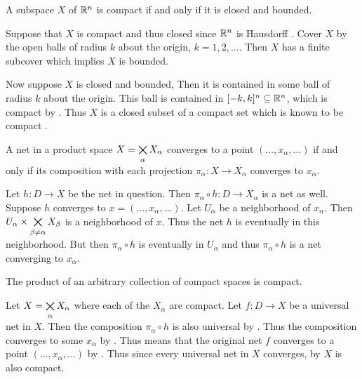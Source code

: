 \documentclass[letterpaper, 11pt, oneside]{book}
\begin{document}
\begin{cor}
  A subspace $X$ of $\mathbb{R}^{n}$ is compact if and only if it is closed and bounded.
\end{cor}
\begin{pf}
  Suppose that $X$ is compact and thus closed since $\mathbb{R}^{n}$ is Hausdorff .
  Cover $X$ by the open balls of radius $k$ about the origin, $k = 1, 2, \ldots$.
  Then $X$ has a finite subcover which implies $X$ is bounded.

  Now suppose $X$ is closed and bounded,
  Then it is contained in some ball of radius $k$ about the origin.
  This ball is contained in $[-k, k]^{n} \subseteq \mathbb{R}^{n}$, which is compact by .
  Thus $X$ is a closed subset of a compact set which is known to be compact .
\end{pf}

\clearpage

\begin{prop}\label{prop: net_of_product_converges}
  A net in a product space $X = \bigtimes\limits_{\alpha} X_{\alpha}$ converges to a point $(\ldots, x_{\alpha}, \ldots)$ if and only if its composition with each projection $\pi_{\alpha}\colon X \to X_{\alpha}$ converges to $x_{\alpha}$.
\end{prop}
\begin{pf}
  Let $h\colon D \to X$ be the net in question.
  Then $\pi_{\alpha} \circ h\colon D \to X_{\alpha}$ is a net as well.
  Suppose $h$ converges to $x = (\ldots, x_{\alpha}, \ldots)$.
  Let $U_{\alpha}$ be a neighborhood of $x_{\alpha}$.
  Then $U_{\alpha} \times \bigtimes\limits_{\beta \neq \alpha} X_{\beta}$ is a neighborhood of $x$.
  Thus the net $h$ is eventually in this neighborhood.
  But then $\pi_{\alpha} \circ h$ is eventually in $U_{\alpha}$ and thus $\pi_{\alpha} \circ h$ is a net converging to $x_{\alpha}$.

\end{pf}

\begin{thrm}\label{thrm: tychonoff}
  The product of an arbitrary collection of compact spaces is compact.
\end{thrm}
\begin{pf}
  Let $X = \bigtimes\limits_{\alpha} X_{\alpha}$ where each of the $X_{\alpha}$ are compact.
  Let $f\colon D \to X$ be a universal net in $X$.
  Then the composition $\pi_{\alpha} \circ h$ is also universal by .
  Thus the composition converges to some $x_{\alpha}$ by .
  Thus means that the original net $f$ converges to a point $(\ldots, x_{\alpha}, \ldots)$ by .
  Thus since every universal net in $X$ converges, by  $X$ is also compact.
\end{pf}
\end{document}
